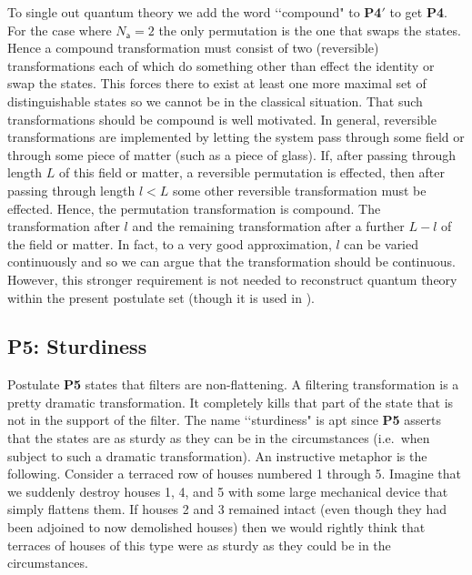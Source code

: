 \documentclass[10pt]{article}
\begin{document}
To single out quantum theory we add the word \lq\lq compound" to {\bf P4}$'$ to get {\bf P4}.  For the case where $N_\mathsf{a}=2$ the only permutation is the one that swaps the states.  Hence a compound transformation must consist of two (reversible) transformations each of which do something other than effect the identity or swap the states.  This forces there to exist at least one more maximal set of distinguishable states so we cannot be in the classical situation.
That such transformations should be compound is well motivated. In general, reversible transformations are implemented by letting the system pass through some field or through some piece of matter (such as a piece of glass).  If, after passing through length $L$ of this field or matter, a reversible permutation is effected, then after passing through length $l<L$ some other reversible transformation must be effected.  Hence, the permutation transformation is compound. The transformation after $l$ and the remaining transformation after a further $L-l$ of the field or matter.  In fact, to a very good approximation, $l$ can be varied continuously and so we can argue that the transformation should be continuous.  However, this stronger requirement is not needed to reconstruct quantum theory within the present postulate set (though it is used in \cite{hardy2001quantum}).

\subsection{{\bf P5}: Sturdiness}

Postulate {\bf P5} states that filters are non-flattening.  A filtering transformation is a pretty dramatic transformation.  It completely kills that part of the state that is not in the support of the filter.  The name \lq\lq sturdiness" is apt since {\bf P5} asserts that the states are as sturdy as they can be in the circumstances (i.e.\ when subject to such a dramatic transformation).  An instructive metaphor is the following.  Consider a terraced row of houses numbered 1 through 5.  Imagine that we suddenly destroy houses 1, 4, and 5 with some large mechanical device that simply flattens them.   If houses 2 and 3 remained intact (even though they had been adjoined to now demolished houses) then we would rightly think that terraces of houses of this type were as sturdy as they could be in the circumstances.
\end{document}

